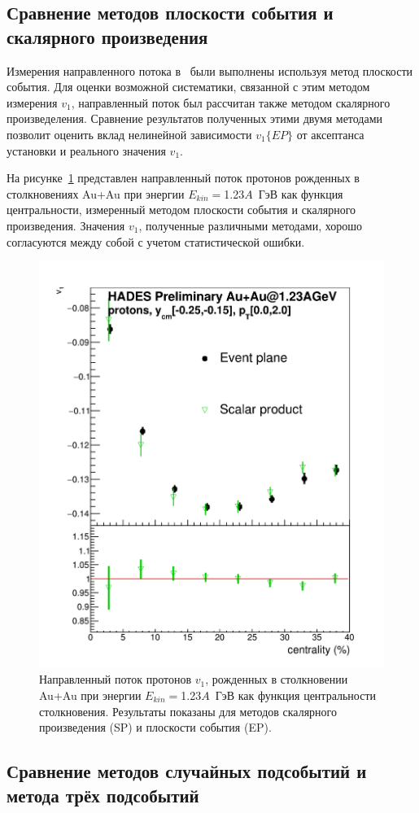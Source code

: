 \subsection{Сравнение методов плоскости события и скалярного произведения}

Измерения направленного потока в~\cite{HADES:2020lob} были выполнены используя метод плоскости события. 
Для оценки возможной систематики, связанной с этим методом измерения $v_1$, направленный поток был рассчитан также методом скалярного произведеления.
Сравнение результатов полученных этими двумя методами позволит оценить вклад нелинейной зависимости $v_1\{EP\}$ от аксептанса установки и реального значения $v_1$.

На рисунке~\ref{fig:hades_ep_vs_sp} представлен направленный поток протонов рожденных в столкновениях Au+Au при энергии $E_{kin}=$1.23$A$~ГэВ как функция центральности, измеренный методом плоскости события и скалярного произведения. 
Значения $v_1$, полученные различными методами, хорошо согласуются между собой с учетом статистической ошибки. 
%
\begin{figure}[ht]
\begin{center}
\includegraphics[width=0.45\linewidth]{images/EP_vs_SP.png}
\caption{Направленный поток протонов $v_1$, рожденных в столкновении Au+Au при энергии $E_{kin}=$1.23$A$~ГэВ как функция центральности столкновения. Результаты показаны для методов скалярного произведения (SP) и плоскости события (EP).}
\label{fig:hades_ep_vs_sp}
\end{center}
\end{figure}

\subsection{Сравнение методов случайных подсобытий и метода трёх подсобытий}

